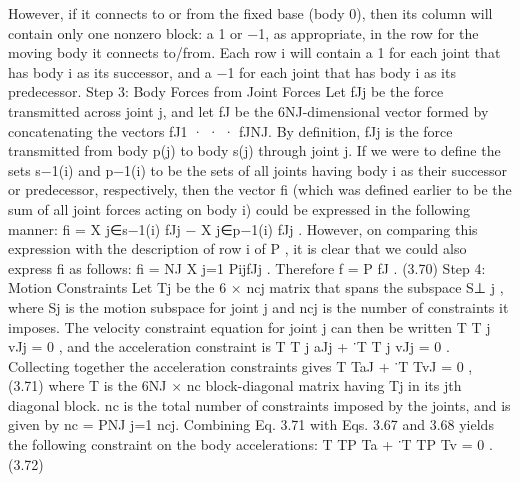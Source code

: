 However, if it connects to or from the fixed base (body 0), then its column will contain only one nonzero block: a 1 or −1, as appropriate, in the row for the moving body it connects to/from. Each row i will contain a 1 for each joint that has body i as its successor, and a −1 for each joint that has body i as its predecessor. Step 3: Body Forces from Joint Forces Let fJj be the force transmitted across joint j, and let fJ be the 6NJ-dimensional vector formed by concatenating the vectors fJ1 · · · fJNJ. By definition, fJj is the force transmitted from body p(j) to body s(j) through joint j. If we were to define the sets s−1(i) and p−1(i) to be the sets of all joints having body i as their successor or predecessor, respectively, then the vector fi (which was defined earlier to be the sum of all joint forces acting on body i) could be expressed in the following manner: fi = X j∈s−1(i) fJj − X j∈p−1(i) fJj . However, on comparing this expression with the description of row i of P , it is clear that we could also express fi as follows: fi = NJ X j=1 PijfJj . Therefore f = P fJ . (3.70) Step 4: Motion Constraints Let Tj be the 6 × ncj matrix that spans the subspace S⊥ j , where Sj is the motion subspace for joint j and ncj is the number of constraints it imposes. The velocity constraint equation for joint j can then be written T T j vJj = 0 , and the acceleration constraint is T T j aJj + ˙T T j vJj = 0 . Collecting together the acceleration constraints gives T TaJ + ˙T TvJ = 0 , (3.71) where T is the 6NJ × nc block-diagonal matrix having Tj in its jth diagonal block. nc is the total number of constraints imposed by the joints, and is given by nc = PNJ j=1 ncj. Combining Eq. 3.71 with Eqs. 3.67 and 3.68 yields the following constraint on the body accelerations: T TP Ta + ˙T TP Tv = 0 . (3.72)

